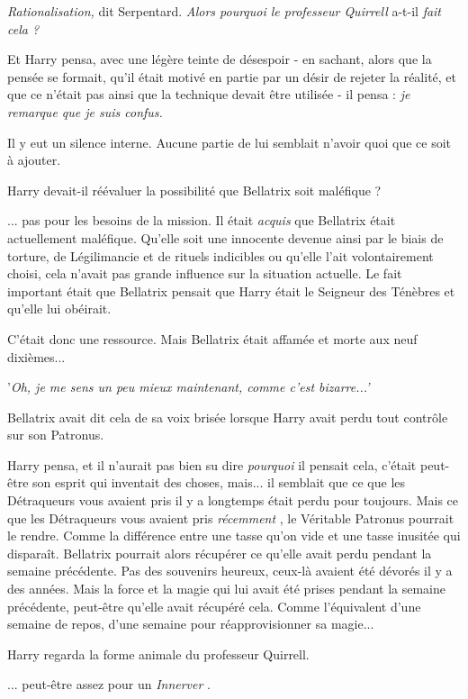 \emph{Rationalisation, } dit Serpentard. \emph{Alors pourquoi le professeur Quirrell } a-t-il \emph{fait cela ?} 

Et Harry pensa, avec une légère teinte de désespoir - en sachant, alors que la pensée se formait, qu'il était motivé en partie par un désir de rejeter la réalité, et que ce n'était pas ainsi que la technique devait être utilisée - il pensa : \emph{je remarque que je suis confus.} 

Il y eut un silence interne. Aucune partie de lui semblait n'avoir quoi que ce soit à ajouter.

Harry devait-il réévaluer la possibilité que Bellatrix soit maléfique ?

... pas pour les besoins de la mission. Il était \emph{acquis}  que Bellatrix était actuellement maléfique. Qu'elle soit une innocente devenue ainsi par le biais de torture, de Légilimancie et de rituels indicibles ou qu'elle l'ait volontairement choisi, cela n'avait pas grande influence sur la situation actuelle. Le fait important était que Bellatrix pensait que Harry était le Seigneur des Ténèbres et qu'elle lui obéirait.

C'était donc une ressource. Mais Bellatrix était affamée et morte aux neuf dixièmes...

'\emph{Oh, je me sens un peu mieux maintenant, comme c'est bizarre...'} 

Bellatrix avait dit cela de sa voix brisée lorsque Harry avait perdu tout contrôle sur son Patronus.

Harry pensa, et il n'aurait pas bien su dire \emph{pourquoi}  il pensait cela, c'était peut-être son esprit qui inventait des choses, mais... il semblait que ce que les Détraqueurs vous avaient pris il y a longtemps était perdu pour toujours. Mais ce que les Détraqueurs vous avaient pris \emph{récemment} , le Véritable Patronus pourrait le rendre. Comme la différence entre une tasse qu'on vide et une tasse inusitée qui disparaît. Bellatrix pourrait alors récupérer ce qu'elle avait perdu pendant la semaine précédente. Pas des souvenirs heureux, ceux-là avaient été dévorés il y a des années. Mais la force et la magie qui lui avait été prises pendant la semaine précédente, peut-être qu'elle avait récupéré cela. Comme l'équivalent d'une semaine de repos, d'une semaine pour réapprovisionner sa magie...

Harry regarda la forme animale du professeur Quirrell.

... peut-être assez pour un \emph{Innerver} .

